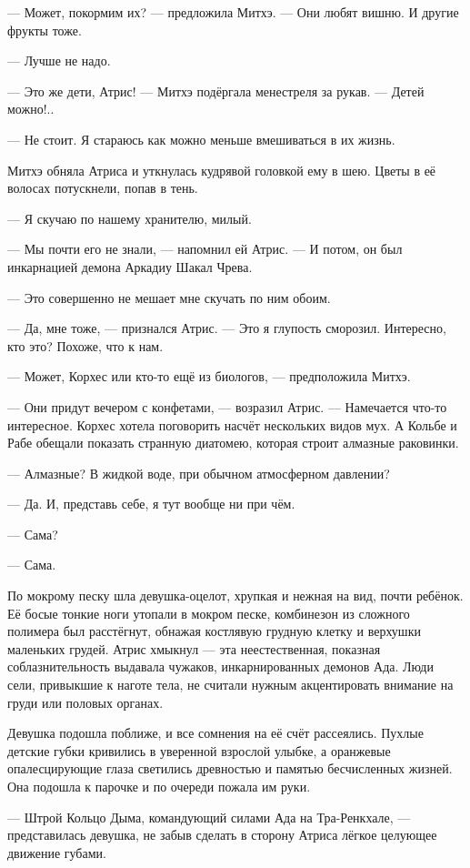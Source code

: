 --- Может, покормим их? --- предложила Митхэ.
--- Они любят вишню.
И другие фрукты тоже.

--- Лучше не надо.

--- Это же дети, Атрис! --- Митхэ подёргала менестреля за рукав.
--- Детей можно!..

--- Не стоит.
Я стараюсь как можно меньше вмешиваться в их жизнь.

Митхэ обняла Атриса и уткнулась кудрявой головкой ему в шею.
Цветы в её волосах потускнели, попав в тень.

--- Я скучаю по нашему хранителю, милый.

--- Мы почти его не знали, --- напомнил ей Атрис.
--- И потом, он был инкарнацией демона Аркадиу Шакал Чрева.

--- Это совершенно не мешает мне скучать по ним обоим.

--- Да, мне тоже, --- признался Атрис.
--- Это я глупость сморозил.
Интересно, кто это?
Похоже, что к нам.

--- Может, Корхес или кто-то ещё из биологов, --- предположила Митхэ.

--- Они придут вечером с конфетами, --- возразил Атрис.
--- Намечается что-то интересное.
Корхес хотела поговорить насчёт нескольких видов мух.
А Кольбе и Рабе обещали показать странную диатомею, которая строит алмазные раковинки.

--- Алмазные?
В жидкой воде, при обычном атмосферном давлении?

--- Да.
И, представь себе, я тут вообще ни при чём.

--- Сама?

--- Сама.

По мокрому песку шла девушка-оцелот, хрупкая и нежная на вид, почти ребёнок.
Её босые тонкие ноги утопали в мокром песке, комбинезон из сложного полимера был расстёгнут, обнажая костлявую грудную клетку и верхушки маленьких грудей.
Атрис хмыкнул --- эта неестественная, показная соблазнительность выдавала чужаков, инкарнированных демонов Ада.
Люди сели, привыкшие к наготе тела, не считали нужным акцентировать внимание на груди или половых органах.

Девушка подошла поближе, и все сомнения на её счёт рассеялись.
Пухлые детские губки кривились в уверенной взрослой улыбке, а оранжевые опалесцирующие глаза светились древностью и памятью бесчисленных жизней.
Она подошла к парочке и по очереди пожала им руки.

--- Штрой Кольцо Дыма, командующий силами Ада на Тра-Ренкхале, --- представилась девушка, не забыв сделать в сторону Атриса лёгкое целующее движение губами.

